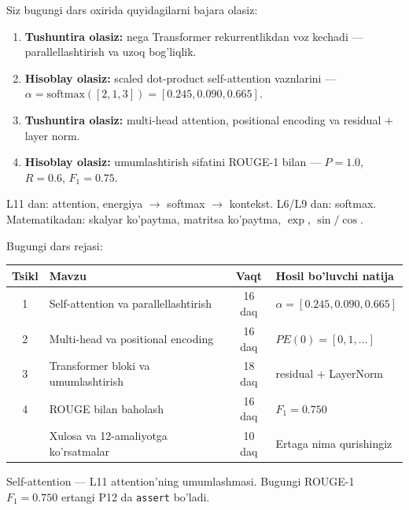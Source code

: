 \documentclass[aspectratio=169,11pt]{beamer}
\begin{document}
\begin{frame}{Siz bugungi dars oxirida quyidagilarni bajara olasiz:}
  \begin{enumerate}\setlength\itemsep{6pt}
    \item \textbf{Tushuntira olasiz:} nega Transformer rekurrentlikdan voz kechadi
          --- parallellashtirish va uzoq bog'liqlik.
    \item \textbf{Hisoblay olasiz:} scaled dot-product self-attention vaznlarini ---
          $\alpha=\mathrm{softmax}([2,1,3])=[0.245,0.090,0.665]$.
    \item \textbf{Tushuntira olasiz:} multi-head attention, positional encoding va
          residual $+$ layer norm.
    \item \textbf{Hisoblay olasiz:} umumlashtirish sifatini ROUGE-1 bilan ---
          $P=1.0$, $R=0.6$, $F_1=0.75$.
  \end{enumerate}
  \vspace{4pt}
  \begin{tcolorbox}[defbox,title=Oldindan talab]
    \footnotesize
    L11 dan: attention, energiya $\to$ softmax $\to$ kontekst. L6/L9 dan: softmax.
    Matematikadan: skalyar ko'paytma, matritsa ko'paytma, $\exp$, $\sin/\cos$.
  \end{tcolorbox}
\end{frame}

\begin{frame}{Bugungi dars rejasi:}
  \begin{center}
  \small
  \begin{tabular}{c p{5.2cm} c p{3.0cm}}
    \toprule
    \textbf{Tsikl}& \textbf{Mavzu} & \textbf{Vaqt} & \textbf{Hosil bo'luvchi natija}\\
    \midrule
    1 & Self-attention va parallellashtirish & 16 daq & $\alpha=[0.245,0.090,0.665]$ \\
    2 & Multi-head va positional encoding & 16 daq & $PE(0)=[0,1,\ldots]$ \\
    3 & Transformer bloki va umumlashtirish & 18 daq & residual $+$ LayerNorm \\
    4 & ROUGE bilan baholash & 16 daq & $F_1=0.750$ \\
    \midrule
      & Xulosa va 12-amaliyotga ko'rsatmalar & 10 daq & Ertaga nima qurishingiz \\
    \bottomrule
  \end{tabular}
  \end{center}
  \vspace{4pt}
  \begin{tcolorbox}[warnbox,title=Bu dars Transformer'ga olib keladi]
    \footnotesize\sloppy
    Self-attention --- L11 attention'ning umumlashmasi. Bugungi
    ROUGE-1 $F_1=0.750$ ertangi P12 da \texttt{assert} bo'ladi.
  \end{tcolorbox}
\end{frame}
\end{document}
